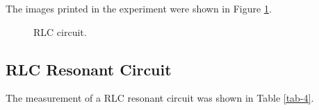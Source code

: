 \documentclass{article}
\begin{document}
The images printed in the experiment were shown in Figure \ref{fig-3}.

\begin{figure}[!h]
  \centering 
  \hspace{0.3in} 
  \hspace{0.3in}   
  \caption{RLC circuit.} 
  \label{fig-3}
\end{figure}

\subsection{RLC Resonant Circuit}

The measurement of a RLC resonant circuit was shown in Table \ref{tab-4}.
\end{document}
